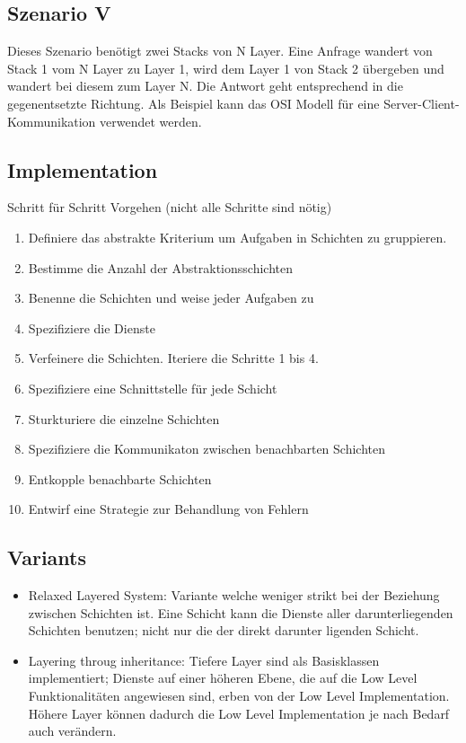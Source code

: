 \subsection*{Szenario V}

Dieses Szenario benötigt zwei Stacks von N Layer. Eine Anfrage wandert von Stack 1 vom N Layer zu Layer 1, wird dem Layer 1 von Stack 2 übergeben und wandert bei diesem zum Layer N. Die Antwort geht entsprechend in die gegenentsetzte Richtung. Als Beispiel kann das OSI Modell für eine Server-Client-Kommunikation verwendet werden.

\subsection*{Implementation}


Schritt für Schritt Vorgehen (nicht alle Schritte sind nötig)

\begin{enumerate}
	\item Definiere das abstrakte Kriterium um Aufgaben in Schichten zu gruppieren.
	\item Bestimme die Anzahl der Abstraktionsschichten
	\item Benenne die Schichten und weise jeder Aufgaben zu
	\item Spezifiziere die Dienste
	\item Verfeinere die Schichten. Iteriere die Schritte 1 bis 4.
	\item Spezifiziere eine Schnittstelle für jede Schicht
	\item Sturkturiere die einzelne Schichten
	\item Spezifiziere die Kommunikaton zwischen benachbarten Schichten
	\item Entkopple benachbarte Schichten
	\item Entwirf eine Strategie zur Behandlung von Fehlern
\end{enumerate}

\subsection*{Variants}

\begin{itemize}
	\item Relaxed Layered System: Variante welche weniger strikt bei der Beziehung zwischen Schichten ist. Eine Schicht kann die Dienste aller darunterliegenden Schichten benutzen; nicht nur die der direkt darunter ligenden Schicht.
	\item Layering throug inheritance: Tiefere Layer sind als Basisklassen implementiert; Dienste auf einer höheren Ebene, die auf die Low Level Funktionalitäten angewiesen sind, erben von der Low Level Implementation. Höhere Layer können dadurch die Low Level Implementation je nach Bedarf auch verändern.
\end{itemize}

